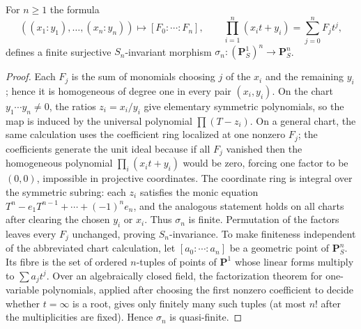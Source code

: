 \begin{lemma}
\label{lemma:weil-pbc-symmetric-product-p1}
\uses{}

For $n\geq1$ the formula
\[
 ((x_1:y_1),\ldots,(x_n:y_n))\longmapsto
 [F_0:\cdots:F_n],\qquad
 \prod_{i=1}^n(x_it+y_i)=\sum_{j=0}^nF_jt^j,
\]
defines a finite surjective $S_n$-invariant morphism
$\sigma_n:(\mathbf P^1_S)^n\to\mathbf P^n_S$.
\end{lemma}
\begin{proof}

Each $F_j$ is the sum of monomials choosing $j$ of the $x_i$ and the
remaining $y_i$; hence it is homogeneous of degree one in every pair
$(x_i,y_i)$.  On the chart $y_1\cdots y_n\ne0$, the ratios
$z_i=x_i/y_i$ give elementary symmetric polynomials, so the map is induced
by the universal polynomial $\prod(T-z_i)$.  On a general chart, the same
calculation uses the coefficient ring localized at one nonzero $F_j$; the
coefficients generate the unit ideal because if all $F_j$ vanished then the
homogeneous polynomial $\prod_i(x_it+y_i)$ would be zero, forcing one factor
to be $(0,0)$, impossible in projective coordinates.  The coordinate ring is
integral over the symmetric subring: each $z_i$ satisfies the monic equation
$T^n-e_1T^{n-1}+\cdots+(-1)^ne_n$, and the analogous statement holds on all
charts after clearing the chosen $y_i$ or $x_i$.  Thus $\sigma_n$ is finite.
Permutation of the factors leaves every $F_j$ unchanged, proving
$S_n$-invariance.  To make finiteness independent of the abbreviated chart
calculation, let $[a_0:\cdots:a_n]$ be a geometric point of $\mathbf P^n_S$.
Its fibre is the set of ordered $n$-tuples of points of $\mathbf P^1$ whose
linear forms multiply to $\sum a_jt^j$.  Over an algebraically closed field,
the factorization theorem for one-variable polynomials, applied after choosing
the first nonzero coefficient to decide whether $t=\infty$ is a root, gives
only finitely many such tuples (at most $n!$ after the multiplicities are
fixed).  Hence $\sigma_n$ is quasi-finite.


\end{proof}
